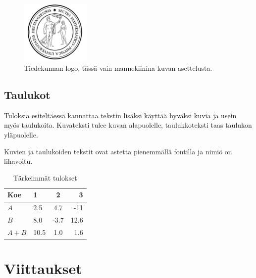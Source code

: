 \documentclass[finnish,twoside,openright,utf]{HYgradu}
\begin{document}
\begin{figure}[h!] 
\centering %
\includegraphics[width=0.3\textwidth]{sinetti.png}
\caption{Tiedekunnan logo, tässä vain mannekiinina kuvan asettelusta.}
\label{fig:sinetti}
\end{figure}

\section{Taulukot}

Tuloksia esiteltäessä kannattaa tekstin lisäksi käyttää hyväksi kuvia ja usein myös taulukoita. Kuvateksti tulee kuvan alapuolelle, taulukkoteksti taas taulukon  yläpuolelle.

Kuvien ja taulukoiden tekstit ovat astetta pienemmällä fontilla ja nimiö on lihavoitu.

\begin{table}
\centering
\caption{Tärkeimmät tulokset}
\label{tab:symbols}
\begin{tabular}{l||l c r} %
Koe & 1 & 2 & 3 \\ 
\hline \hline %
$A$ & 2.5 & 4.7 & -11 \\
$B$ & 8.0 & -3.7 & 12.6 \\
$A+B$ & 10.5 & 1.0 & 1.6 \\
\hline
%
\end{tabular}
\end{table}

\chapter{Viittaukset}
\end{document}
